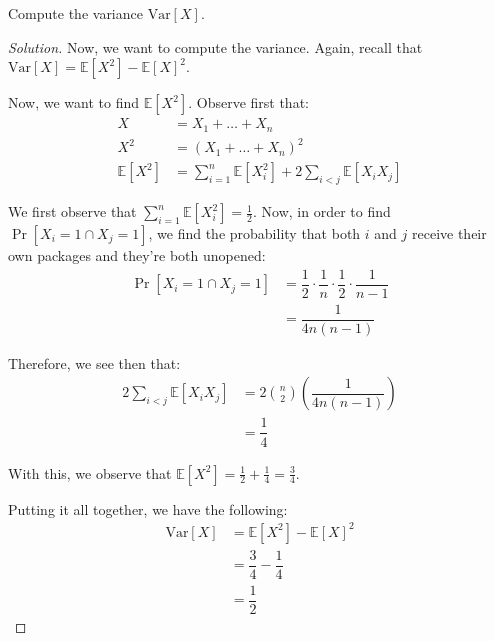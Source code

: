 \documentclass{article}
\newenvironment{solution}{\begin{proof}[Solution]}{\end{proof}}
\let\oldsum\sum
\renewcommand{\sum}[2]{\oldsum\limits_{#1}^{#2}}
\begin{document}
\begin{hw}
	Compute the variance $\mathrm{Var}[X]$.
\end{hw}
\begin{solution}
	Now, we want to compute the variance. Again, recall that $\mathrm{Var}[X] = \mathbb{E}[X^{2}] - \mathbb{E}[X]^{2}$.
	
	Now, we want to find $\mathbb{E}[X^{2}]$. Observe first that:
	\begin{align*}
		X &= X_{1} + \ldots + X_{n} \\
		X^{2} &= (X_{1} + \ldots + X_{n})^{2} \\
		\mathbb{E}[X^{2}] &= \sum{i=1}{n}\mathbb{E}[X_{i}^{2}] + 2\sum{i<j}{}\mathbb{E}[X_{i}X_{j}]
	\end{align*}

	We first observe that $\sum{i=1}{n}\mathbb{E}[X_{i}^{2}] = \frac{1}{2}$. Now, in order to find $\Pr[X_{i} = 1 \cap X_{j} = 1]$, we find the probability that both $i$ and $j$ receive their own packages and they're both unopened:
	\begin{align*}
		\Pr[X_{i} = 1 \cap X_{j} = 1] &= \dfrac{1}{2}\cdot\dfrac{1}{n}\cdot\dfrac{1}{2}\cdot\dfrac{1}{n-1} \\
		&= \dfrac{1}{4n(n-1)}
	\end{align*}

	Therefore, we see then that:
	\begin{align*}
		2\sum{i<j}{}\mathbb{E}[X_{i}X_{j}] &= 2\binom{n}{2}\left( \dfrac{1}{4n(n-1)} \right) \\
		&= \dfrac{1}{4}
	\end{align*}

	With this, we observe that $\mathbb{E}[X^{2}] = \frac{1}{2} + \frac{1}{4} = \frac{3}{4}$.
	
	Putting it all together, we have the following:
	\begin{align*}
		\mathrm{Var}[X] &= \mathbb{E}[X^{2}] - \mathbb{E}[X]^{2} \\
		&= \dfrac{3}{4} - \dfrac{1}{4} \\
		&= \dfrac{1}{2}
	\end{align*}
\end{solution}
	
%	
%	
\end{document}
